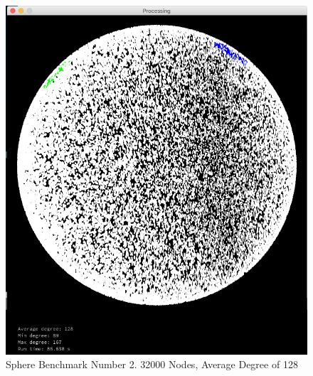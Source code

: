 \documentclass{article}
\begin{document}
\begin{figure}
    \centering
    \includegraphics[scale=0.45]{./images/sphere_1.png}
    \caption{Sphere Benchmark Number 2. 32000 Nodes, Average Degree of 128}
    \label{sphere1}
\end{figure}
\end{document}
